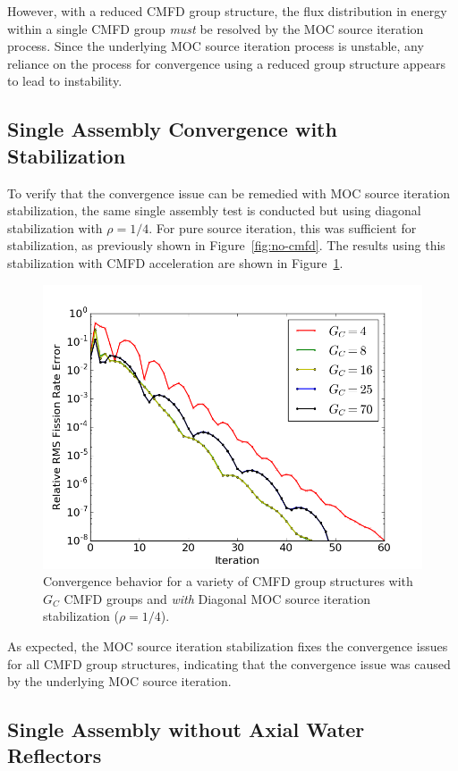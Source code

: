However, with a reduced \ac{CMFD} group structure, the flux distribution in energy within a single \ac{CMFD} group \textit{must} be resolved by the \ac{MOC} source iteration process. Since the underlying \ac{MOC} source iteration process is unstable, any reliance on the process for convergence using a reduced group structure appears to lead to instability.

\subsection{Single Assembly Convergence with Stabilization}

To verify that the convergence issue can be remedied with \ac{MOC} source iteration stabilization, the same single assembly test is conducted but using diagonal stabilization with $\rho = 1/4$. For pure source iteration, this was sufficient for stabilization, as previously shown in Figure~\ref{fig:no-cmfd}. The results using this stabilization with \ac{CMFD} acceleration are shown in Figure~\ref{fig:sa-cmfd-stab}. 
\begin{figure}[ht!]
	\centering
	\includegraphics[width=0.71\linewidth]{figures/convergence/sa_stab_cmfd.png}
	\caption{Convergence behavior for a variety of \ac{CMFD} group structures with $G_C$ \ac{CMFD} groups and \textit{with} Diagonal \ac{MOC} source iteration stabilization ($\rho = 1/4$).}
	\label{fig:sa-cmfd-stab}
\end{figure}
As expected, the \ac{MOC} source iteration stabilization fixes the convergence issues for all \ac{CMFD} group structures, indicating that the convergence issue was caused by the underlying \ac{MOC} source iteration.

\subsection{Single Assembly without Axial Water Reflectors}
\label{sec:sa-no-axial-ref}

